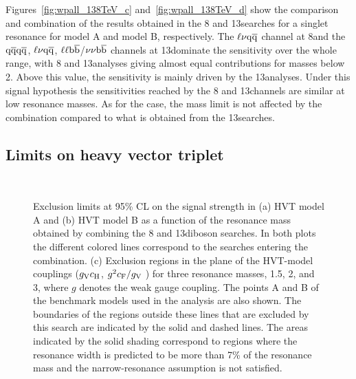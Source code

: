 Figures~\ref{fig:wpall_138TeV_c} and~\ref{fig:wpall_138TeV_d} show the comparison and combination of the results obtained in the 8 and 13\TeV searches for a \Zpr singlet resonance for model A and model B, respectively.
The $\ell \nu \mathrm{q}\overline{\mathrm{q}}$ channel at 8\TeV and the $\mathrm{q}\overline{\mathrm{q}} \mathrm{q}\overline{\mathrm{q}}$, $\ell \nu \mathrm{q}\overline{\mathrm{q}}$, $\ell\ell{\mathrm{b}\overline{\mathrm{b}}}$/$\nu\nu{\mathrm{b}\overline{\mathrm{b}}}$ channels at 13\TeV dominate the sensitivity over the whole range, with 8 and 13\TeV analyses giving almost equal contributions for masses below 2\TeV. Above this value, the sensitivity is mainly driven by the 13\TeV analyses.
Under this signal hypothesis the sensitivities reached by the 8 and 13\TeV channels are similar at low resonance masses. %
As for the \Wpr case, the mass limit is not affected by the combination compared to what is obtained from the 13\TeV searches.

\subsection{Limits on heavy vector triplet \PVpr}\label{subsec:comboHVT}

\begin{figure}[!htb]
\centering
{}
\\
\caption{
Exclusion limits at 95\% CL on the signal strength in (a) HVT model A and (b) HVT model B as a function of the resonance mass obtained by combining the 8 and 13\TeV diboson searches. In both plots the different colored lines correspond to the searches entering the combination.
(c) Exclusion regions in the plane of the HVT-model couplings ($g_{\rm V}c_{\rm H}$, $g^2c_{\rm F}/g_{\rm V}$ ) for three resonance masses, 1.5, 2, and 3\TeV, where $g$ denotes the weak gauge coupling. The points A and B of the benchmark models used in the analysis are also shown.
The boundaries of the regions outside these lines that are excluded by this search are indicated by the solid and dashed lines.
The areas indicated by the solid shading correspond to regions where the resonance width is predicted to be more than 7\% of the resonance mass and the narrow-resonance assumption is not satisfied.
}
\label{fig:hvtall_138TeV}
\end{figure}

